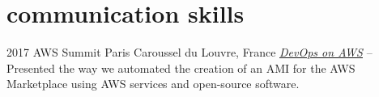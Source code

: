 \documentclass[]{cv-a4}
\begin{document}

\section{communication skills}

\begin{entrylist}


\entry
{2017}
{AWS Summit Paris}
{Caroussel du Louvre, France}
{\emph{\href{https://youtu.be/54cwFTMPxOo}{DevOps on AWS} } -- Presented the way we automated the creation of an AMI for the AWS Marketplace using AWS services and open-source software.}


\end{entrylist}
\end{document}
